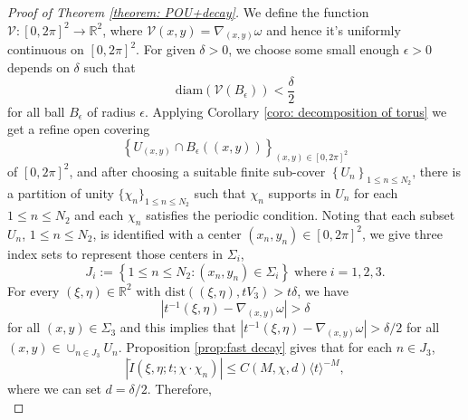 \documentclass[10pt,a4paper]{amsart}
\newcommand\JP[1]{\langle#1\rangle}
\newcommand{\R}{\mathbb{R}}
\begin{document}
\begin{proof}[Proof of Theorem \ref{theorem: POU+decay}]
    We define the function $\mathcal{V}:\left[0,2\pi\right]^{2}\to \R^{2}$, where $\mathcal{V}\left(x,y\right)=\nabla_{\left(x,y\right)}\omega$ and hence it's uniformly continuous on $\left[0,2\pi\right]^{2}$. For given $\delta>0$, we choose some small enough $\epsilon>0$ depends on $\delta$ such that
    \begin{equation*}
        \mathrm{diam}\left(\mathcal{V}\left(B_{\epsilon}\right)\right)<\frac{\delta}{2}
    \end{equation*}
    for all ball $B_{\epsilon}$ of radius $\epsilon$. Applying Corollary \ref{coro: decomposition of torus} we get a refine open covering \begin{equation*}
        \left\{U_{\left(x,y\right)}\cap B_{\epsilon}\left(\left(x,y\right)\right)\right\}_{\left(x,y\right)\in\left[0,2\pi\right]^{2}}
    \end{equation*} 
    of $\left[0,2\pi\right]^{2}$, and after choosing a suitable finite sub-cover $\left\{U_{n}\right\}_{1\leq n\leq N_{2}}$, there is a partition of unity $\{\chi_{n}\}_{1\leq n\leq N_{2}}$ such that $\chi_{n}$ supports in $U_{n}$ for each $1\leq n\leq N_{2}$ and each $\chi_{n}$ satisfies the periodic condition. Noting that each subset $U_{n}$, $1\leq n\leq N_{2}$, is identified with a center $\left(x_{n},y_{n}\right)\in\left[0,2\pi\right]^{2}$, we give three index sets to represent those centers in $\Sigma_{i}$,
    \begin{equation*}
        J_{i}:=\left\{1\leq n\leq N_{2}:\left(x_{n},y_{n}\right)\in\Sigma_{i}\right\}\;\mathrm{where}\;i=1,2,3.
    \end{equation*}
    For every $\left(\xi,\eta\right)\in \R^{2}$ with $\mathrm{dist}\left(\left(\xi,\eta\right),tV_{3}\right)>t\delta$, we have
    \begin{equation*}
        \left|t^{-1}\left(\xi,\eta\right)-\nabla_{\left(x,y\right)}\omega\right|>\delta
    \end{equation*}
    for all $\left(x,y\right)\in \Sigma_{3}$ and this implies that $\left|t^{-1}\left(\xi,\eta\right)-\nabla_{\left(x,y\right)}\omega\right|>\delta/2$ for all $\left(x,y\right)\in\cup_{n\in J_{3}}U_{n}$. Proposition \ref{prop:fast decay} gives that for each $n\in J_{3}$, 
    \begin{equation*}
        \left|\widetilde{I}\left(\xi,\eta;t;\chi\cdot\chi_{n}\right)\right|\leq C\left(M,\chi,d\right)\JP{t}^{-M},
    \end{equation*}
    where we can set $d=\delta/2$. Therefore, 
    \begin{equation*}

\end{equation*}
\end{proof}
\end{document}
